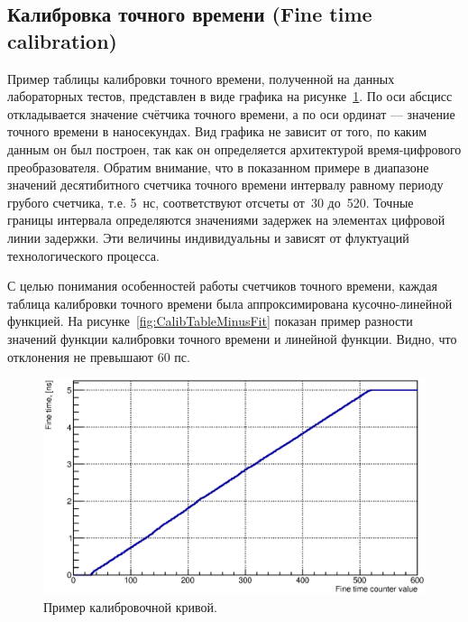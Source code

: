 \subsection{Калибровка точного времени (Fine time calibration)}\label{section:FTcalib}

Пример таблицы калибровки точного времени, полученной на данных лабораторных тестов, представлен в виде графика на рисунке~\ref{fig:TypicalCalibTable}. По оси абсцисс откладывается значение счётчика точного времени, а по оси ординат --- значение точного времени в наносекундах. Вид графика не зависит от того, по каким данным он был построен, так как он определяется архитектурой время-цифрового преобразователя. Обратим внимание, что в показанном примере в диапазоне значений десятибитного счетчика точного времени интервалу равному периоду грубого счетчика, т.е. 5~нс, соответствуют отсчеты от~30 до~520. Точные границы интервала определяются значениями задержек на элементах цифровой линии задержки. Эти величины индивидуальны и зависят от флуктуаций технологического процесса.

С целью понимания особенностей работы счетчиков точного времени, каждая таблица калибровки точного времени была аппроксимирована кусочно-линейной функцией. На рисунке~\ref{fig:CalibTableMinusFit} показан пример разности значений функции калибровки точного времени и линейной функции. Видно, что отклонения не превышают 60 пс.

\begin{figure}
\includegraphics[width=1.0\textwidth]{pictures/CalTable_0010_01.eps}
\caption{Пример калибровочной кривой.}
\label{fig:TypicalCalibTable}
\end{figure}

